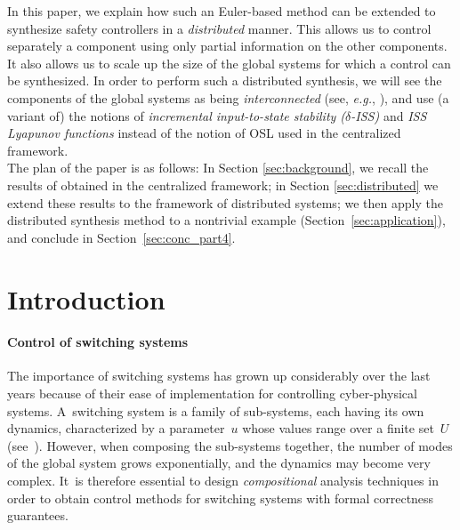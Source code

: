 


In this paper, we explain how such an Euler-based method can be extended to
synthesize safety controllers in a {\em distributed} manner. This allows us
to control separately a component using only partial information on the other
components. It also allows us to scale up the size of the global systems for
which a control can be synthesized. In order to perform such a distributed
synthesis, we will see the components of the global systems as being {\em interconnected}
(see, \textit{e.g.}, \cite{yang2015lyapunov}),
and use (a variant of) the notions of {\em incremental input-to-state stability ($\delta$-ISS)}
and {\em ISS Lyapunov functions}
\cite{jiang1996lyapunov}
instead of the notion of OSL used in the centralized framework.\\


The plan of the paper is as follows: In Section \ref{sec:background}, we recall the
results of \cite{SNR17} obtained in the centralized framework; in Section \ref{sec:distributed}
we extend these results to the framework of distributed systems;
we then apply the distributed synthesis method to a nontrivial example
(Section~\ref{sec:application}), and conclude in Section~\ref{sec:conc_part4}.




\section{Introduction}
\paragraph{Control of switching systems}
The importance of switching systems has grown up considerably over the
last years because of their ease of implementation for controlling
cyber-physical systems.  A~switching system is a family of
sub-systems, each having its own dynamics, characterized by a
parameter~$u$ whose values range over a finite set~$U$
(see~\cite{liberzon2012switching}). However, when composing
the sub-systems together, the number of modes of the global system
grows exponentially, and the dynamics may become very complex.
It~is therefore essential to design \emph{compositional} analysis techniques
in order to obtain control methods for switching systems
with formal correctness guarantees.

